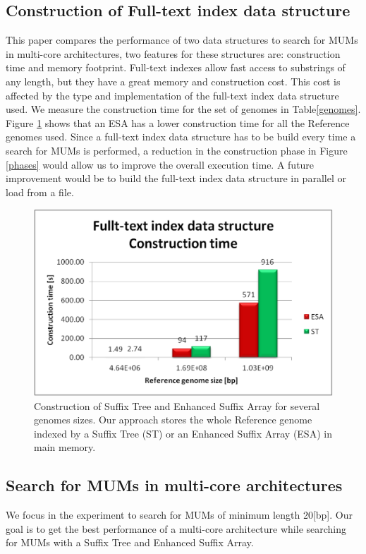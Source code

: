 \documentclass[runningheads,a5paper]{llncs}
\begin{document}
\subsection{Construction of Full-text index data structure}
This paper compares the performance of two data structures to search for MUMs in multi-core architectures, two features for these structures are: construction time and memory footprint. Full-text indexes allow fast access to substrings of any length, but they have a great memory and construction cost. This cost is affected by the type and implementation of the full-text index data structure used. 
We measure the construction time for the set of genomes in Table\ref{genomes}. Figure \ref{fig:construction} shows that an ESA has a lower construction time for all the Reference genomes used. Since a full-text index data structure has to be build every time a search for MUMs is performed, a reduction in the construction phase in Figure \ref{phases} would allow us to improve the overall execution time. A future improvement would be to build the full-text index data structure in parallel or load from a file.
 \begin{figure}[!htbp]
  \centering
  \includegraphics[scale=0.3]{construction.eps}
  \caption{Construction of Suffix Tree and Enhanced Suffix Array for several genomes sizes. Our approach stores the whole Reference genome indexed by a Suffix Tree (ST) or an Enhanced Suffix Array (ESA) in main memory.}
  \label{fig:construction}
 \end{figure}  
 \subsection{Search for MUMs in multi-core architectures}
We focus in the experiment to search for MUMs of minimum length 20[bp]. Our goal is to get the best performance of a multi-core architecture while searching for MUMs with a Suffix Tree and Enhanced Suffix Array.
\end{document}
